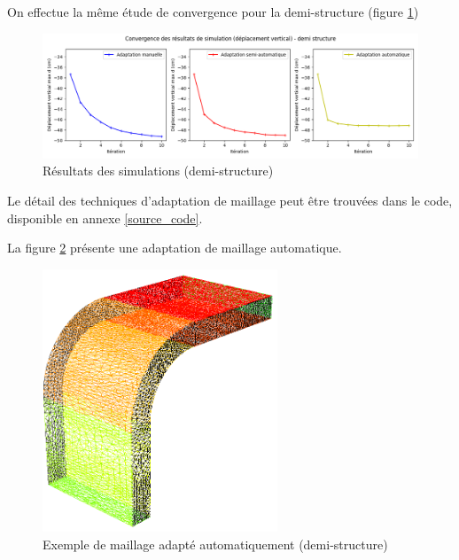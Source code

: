     On effectue la même étude de convergence pour la demi-structure (figure \ref{fig:h_cvg})

    \begin{figure}        
        \begin{center}
        
            \includegraphics[width=16.5cm]{imgs/cvgH.png}
            \caption{Résultats des simulations (demi-structure)}
            \label{fig:h_cvg}
        
        \end{center}
    \end{figure}

    Le détail des techniques d'adaptation de maillage peut être trouvées dans le code, disponible en annexe \ref{source_code}.

    La figure \ref{fig:maillage_auto} présente une adaptation de maillage automatique.
    
    \begin{figure}        
        \begin{center}
        
            \includegraphics[width=7cm]{imgs/half_maillage_auto.PNG}
            \caption{Exemple de maillage adapté automatiquement (demi-structure)}
            \label{fig:maillage_auto}
        
        \end{center}
    \end{figure}


